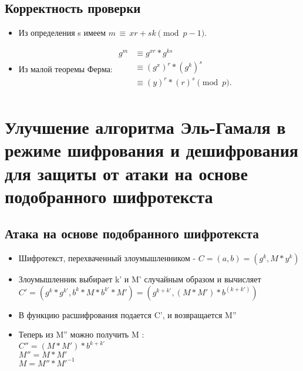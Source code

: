\documentclass[a4paper]{article}
\begin{document}
\subsection*{Корректность проверки}

\begin{itemize}
    \item Из определения s имеем ${m\,\equiv \,xr+sk{\pmod {p-1}}.}$
    \item Из малой теоремы Ферма: ${{\begin{aligned}g^{m}&\equiv g^{xr} * g^{ks}\\&\equiv (g^{x})^{r} * (g^{k})^{s}\\&\equiv (y)^{r} * (r)^{s}{\pmod {p}}.\\\end{aligned}}}$
\end{itemize}

\section*{Улучшение алгоритма Эль-Гамаля в режиме шифрования и дешифрования для защиты от атаки на основе подобранного шифротекста}
\subsection*{Атака на основе подобранного шифротекста}
\begin{itemize}
    \item Шифротекст, перехваченный злоумышленником - $C = (a, b) = (g^k, M * y^k)$
    \item Злоумышленник выбирает k' и M' случайным образом и вычисляет \\
    $C' = (g^k * g^{k'}, b^k * M * b^{k'} * M') = (g^{k + k'}, (M*M') * b ^ (k + k'))$
    \item В функцию расшифрования подается C', и возвращается M''
    \item Теперь из M'' можно получить M :\\
    $C'' = (M * M') * b ^ {k + k'}$\\
    $M'' = M * M'$\\
    $M = M'' * M'^{-1}$
\end{itemize}
\end{document}
